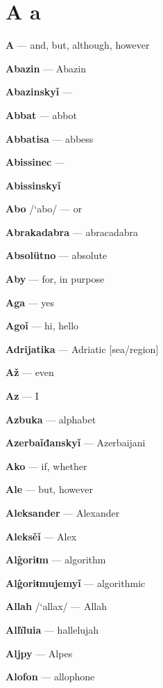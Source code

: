 \chapter{A a}

\textbf{A}  — and, but, although, however

\textbf{Abazin}  — Abazin

\textbf{Abazinskyǐ}  —

\textbf{Abbat}  — abbot

\textbf{Abbatisa}  — abbess

\textbf{Abissinec}  —

\textbf{Abissinskyǐ} 

\textbf{Abo} /`abo/ — or

\textbf{Abrakadabra}  — abracadabra

\textbf{Absolütno} — absolute

\textbf{Aby}  — for, in purpose

\textbf{Aga}  — yes

\textbf{Agoǐ}  — hi, hello

\textbf{Adrijatika}  — Adriatic [sea/region]

\textbf{Až}  — even

\textbf{Az}  — I

\textbf{Azbuka}  — alphabet

\textbf{Azerbaǐđanskyǐ}  — Azerbaijani

\textbf{Ako}  — if, whether

\textbf{Ale}  — but, however

\textbf{Aleksander}  — Alexander

\textbf{Aleksěǐ}  — Alex

\textbf{Alĝoriŧm} — algorithm

\textbf{Alĝoriŧmujemyǐ} — algorithmic

\textbf{Allah} /`allax/ — Allah

\textbf{Allïluia}  — hallelujah

\textbf{Aljpy}  — Alpes

\textbf{Alofon} — allophone

